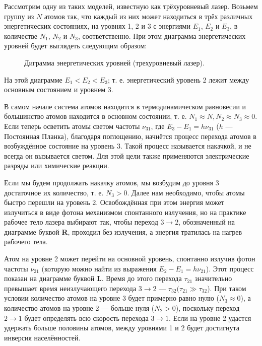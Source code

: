 \documentclass[a4paper, 12pt, openany]{book}
\begin{document}
	\tab Рассмотрим одну из таких моделей, известную как трёхуровневый лазер. Возьмем группу из $N$ атомов так, что каждый из них может находиться в трёх различных энергетических состояниях, на уровнях 1, 2 и 3 с энергиями $E_1$, $E_2$ и $E_3$, в количестве $N_1$, $N_2$ и $N_3$, соответственно. При этом диаграмма энергетических уровней будет выглядеть следующим образом:
	\begin{figure}[h]
		\caption{
			Диграмма энергетических уровней (трехуровневый лазер).
		}
		\label{diag1}
	\end{figure}
	\newpage
	На этой диаграмме $E_1 < E_2 < E_3$; т. е. энергетический уровень 2 лежит между основным состоянием и уровнем 3.
	
	В самом начале система атомов находится в термодинамическом равновесии и большинство атомов находится в основном состоянии, т. е. $N_1 \approx N, N_2 \approx N_3 \approx 0$. Если теперь осветить атомы светом частоты $\nu_{31}$, где $E_3 - E_1 = h\nu_{31}$ ($h$ — Постоянная Планка), благодаря поглощению, начнётся процесс перехода атомов в возбуждённое состояние на уровень 3. Такой процесс называется накачкой, и не всегда он вызывается светом. Для этой цели также применяются электрические разряды или химические реакции.
	
	Если мы будем продолжать накачку атомов, мы возбудим до уровня 3 достаточное их количество, т. е. $N_3 > 0$. Далее нам необходимо, чтобы атомы быстро перешли на уровень 2. Освобождённая при этом энергия может излучиться в виде фотона механизмом спонтанного излучения, но на практике рабочее тело лазера выбирают так, чтобы переход $3 \rightarrow 2$, обозначенный на диаграмме буквой \textbf{R}, проходил без излучения, а энергия тратилась на нагрев рабочего тела.
	
	Атом на уровне 2 может перейти на основной уровень, спонтанно излучив фотон частоты $\nu_{21}$ (которую можно найти из выражения $E_2-E_1 = h\nu_{21}$). Этот процесс показан на диаграмме буквой \textbf{L}. Время до этого перехода $\tau_{21}$ значительно превышает время неизлучающего перехода $3 \rightarrow 2$ — $\tau_{32} (\tau_{21} \gg \tau_{32}$). При таком условии количество атомов на уровне 3 будет примерно равно нулю ($N_3 \approx 0$), а количество атомов на уровне 2 — больше нуля ($N_2 > 0$), поскольку переход $2 \rightarrow 1$ будет определять всю скорость перехода $3 \rightarrow 1$. Если на уровне 2 удастся удержать больше половины атомов, между уровнями 1 и 2 будет достигнута инверсия населённостей.
	
\end{document}

